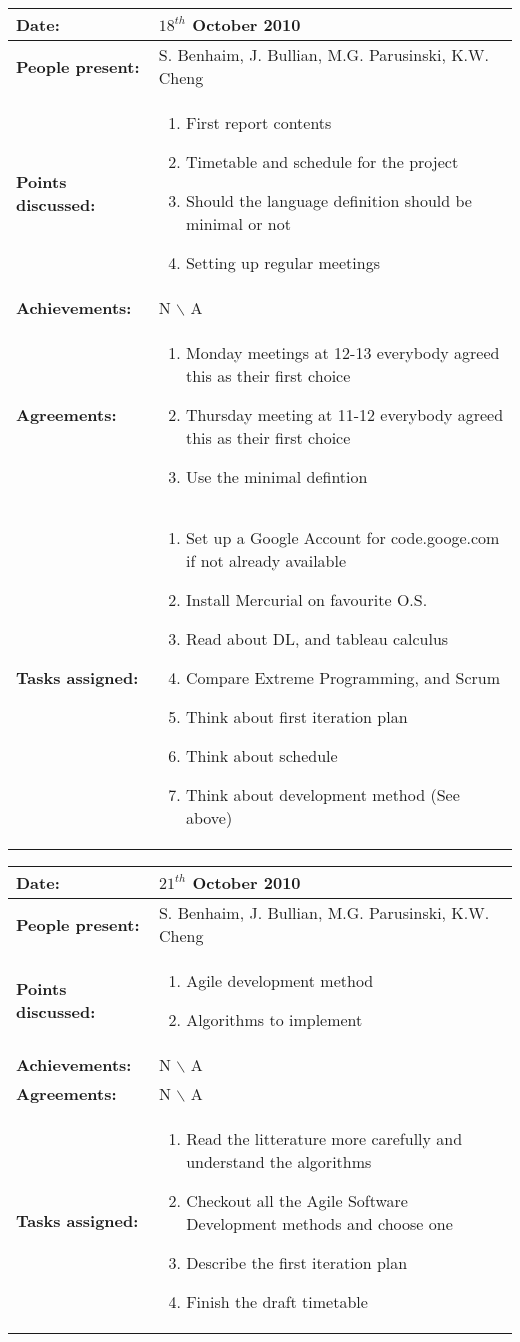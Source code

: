 \documentclass[12pt,a4paper]{article}
\newcommand{\meeting}[6]{%
\begin{center}%
\begin{longtable}{| p{3.5cm} | | p{13cm} |}%
\hline%
\textbf{Date:} & #1 \\%
\hline%
\textbf{People present:} &#2 \\%
\hline%
\textbf{Points discussed:} &#3\\%
\hline%
\textbf{Achievements:} &#4 \\%
\hline%
\textbf{Agreements:} &#5 \\%
\hline%
\textbf{Tasks assigned:} &#6  \\%
\hline%
\end{longtable}%
\end{center}%
\bigbreak
}
\begin{document}
\meeting{$18^{th}$ October 2010}%
{S. Benhaim, J. Bullian, M.G. Parusinski, K.W. Cheng}%
{ \begin{enumerate} \item First report contents
\item Timetable and schedule for the project
\item Should the language definition should be minimal or not
\item Setting up regular meetings
\end{enumerate} }%
{ N $\backslash$ A}%
{\begin{enumerate}
\item Monday meetings at 12-13 everybody agreed this as their first choice
\item Thursday meeting at 11-12 everybody agreed this as their first choice
\item Use the minimal defintion
\end{enumerate}}
{ \begin{enumerate}
\item Set up a Google Account for code.googe.com if not already available
\item Install Mercurial on favourite O.S.
\item Read about DL, and tableau calculus
\item Compare Extreme Programming, and Scrum
\item Think about first iteration plan
\item Think about schedule
\item Think about development method (See above)
\end{enumerate}}%

\meeting{$21^{th}$ October 2010}%
{S. Benhaim, J. Bullian, M.G. Parusinski, K.W. Cheng}%
{ \begin{enumerate} 
\item Agile development method
\item Algorithms to implement
\end{enumerate} }%
{ N $\backslash$ A}%
{N $\backslash$ A}
{ \begin{enumerate}
\item Read the litterature more carefully and understand the algorithms
\item Checkout all the Agile Software Development methods and choose one
\item Describe the first iteration plan
\item Finish the draft timetable
\end{enumerate}}%
\end{document}
